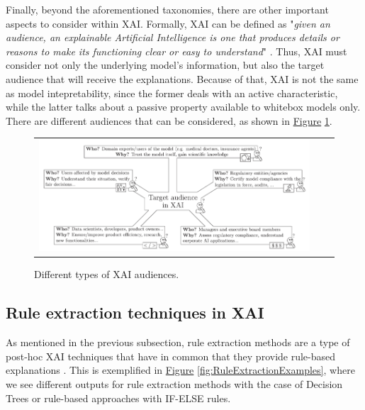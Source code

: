 Finally, beyond the aforementioned taxonomies, there are other important aspects to consider within XAI. Formally, XAI can be defined as "\textit{given an audience, an explainable Artificial Intelligence is one that produces details or reasons to make its functioning clear or easy to understand}" \parencite{arrieta2020explainable}. Thus, XAI must consider not only the underlying model's information, but also the target audience that will receive the explanations. Because of that, XAI is not the same as model intepretability, since the former deals with an active characteristic, while the latter talks about a passive property available to whitebox models only. There are different audiences that can be considered, as shown in \hyperref[fig:XAIaudience]{Figure} \ref{fig:XAIaudience}.

\begin{figure}[h!]
\centering
 \begin{tabular}{c@{\qquad}c@{\qquad}c}
\includegraphics[width=0.8\columnwidth]{figures/XAI_audience.png}
  \end{tabular} 
  \caption{Different types of XAI audiences. \parencite{arrieta2020explainable}\label{fig:XAIaudience}}
\end{figure}


\subsection{Rule extraction techniques in XAI}\label{subsec:ch2-sota-xai-rule-extraction}
As mentioned in the previous subsection, rule extraction methods are a type of post-hoc XAI techniques that have in common that they provide rule-based explanations  \parencite{arrieta2020explainable}. This is exemplified in \hyperref[fig:RuleExtractionExamples]{Figure} \ref{fig:RuleExtractionExamples}, where we see different outputs for rule extraction methods with the case of Decision Trees or rule-based approaches with IF-ELSE rules.

